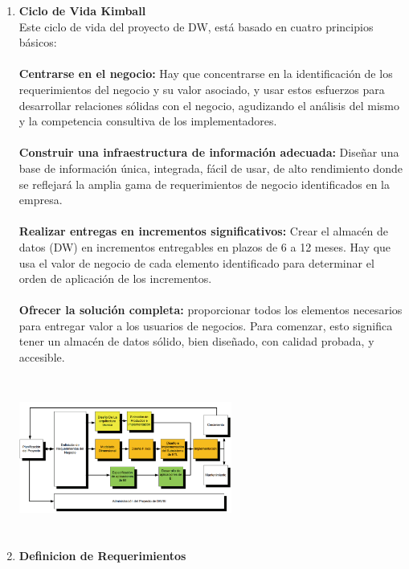 \documentclass[twoside,twocolumn]{article}
\begin{document}
\begin{enumerate}
 \item \textbf{Ciclo de Vida Kimball}\\
Este ciclo de vida del proyecto de DW, está basado en cuatro principios básicos:\\ \\
\textbf{Centrarse en el negocio:} Hay que concentrarse en la identificación de los requerimientos del negocio y su valor asociado, y usar estos esfuerzos para desarrollar relaciones sólidas con el negocio, agudizando el análisis del mismo y la competencia consultiva de los implementadores. \\ \\
\textbf{Construir una infraestructura de información adecuada:} Diseñar una base de información única, integrada, fácil de usar, de alto rendimiento donde se reflejará la amplia gama de requerimientos de negocio identificados en la empresa. \\ \\
\textbf{Realizar entregas en incrementos significativos:} Crear el almacén de datos (DW) en incrementos entregables en plazos de 6 a 12 meses. Hay que usa el valor de negocio de cada elemento identificado para determinar el orden de aplicación de los incrementos.\\ \\
\textbf{Ofrecer la solución completa:} proporcionar todos los elementos necesarios para entregar valor a los usuarios de negocios. Para comenzar, esto significa tener un almacén de datos sólido, bien diseñado, con calidad probada, y accesible. \\ \\

\includegraphics[width=7cm, height=5cm]{Imagenes/ciclodevidakimball}


 \item \textbf{Definicion de Requerimientos}\\
 

\end{enumerate}
\end{document}
